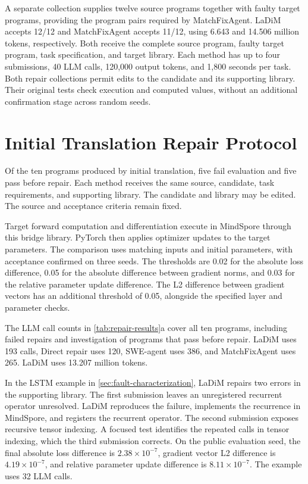 A separate collection supplies twelve source programs together with faulty target programs, providing the program pairs required by MatchFixAgent. LaDiM accepts 12/12 and MatchFixAgent accepts 11/12, using 6.643 and 14.506 million tokens, respectively. Both receive the complete source program, faulty target program, task specification, and target library. Each method has up to four submissions, 40 LLM calls, 120,000 output tokens, and 1,800 seconds per task. Both repair collections permit edits to the candidate and its supporting library. Their original tests check execution and computed values, without an additional confirmation stage across random seeds.

\section{Initial Translation Repair Protocol}
\label{sec:natural-protocol}
Of the ten programs produced by initial translation, five fail evaluation and five pass before repair. Each method receives the same source, candidate, task requirements, and supporting library. The candidate and library may be edited. The source and acceptance criteria remain fixed.

Target forward computation and differentiation execute in MindSpore through this bridge library. PyTorch then applies optimizer updates to the target parameters. The comparison uses matching inputs and initial parameters, with acceptance confirmed on three seeds. The thresholds are 0.02 for the absolute loss difference, 0.05 for the absolute difference between gradient norms, and 0.03 for the relative parameter update difference. The L2 difference between gradient vectors has an additional threshold of 0.05, alongside the specified layer and parameter checks.

The LLM call counts in \cref{tab:repair-results}a cover all ten programs, including failed repairs and investigation of programs that pass before repair. LaDiM uses 193 calls, Direct repair uses 120, SWE-agent uses 386, and MatchFixAgent uses 265. LaDiM uses 13.207 million tokens.

In the LSTM example in \cref{sec:fault-characterization}, LaDiM repairs two errors in the supporting library. The first submission leaves an unregistered recurrent operator unresolved. LaDiM reproduces the failure, implements the recurrence in MindSpore, and registers the recurrent operator. The second submission exposes recursive tensor indexing. A focused test identifies the repeated calls in tensor indexing, which the third submission corrects. On the public evaluation seed, the final absolute loss difference is $2.38\times10^{-7}$, gradient vector L2 difference is $4.19\times10^{-7}$, and relative parameter update difference is $8.11\times10^{-7}$. The example uses 32 LLM calls.

